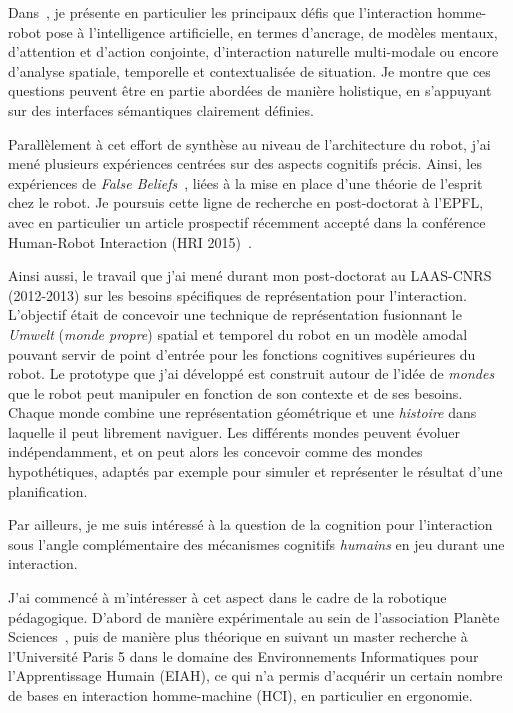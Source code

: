\documentclass[a4paper]{article}
\begin{document}
Dans~\cite{lemaignan2015human}, je présente en particulier les
principaux défis que l'interaction homme-robot pose à l'intelligence
artificielle, en termes d'ancrage, de modèles mentaux, d'attention et
d'action conjointe, d'interaction naturelle multi-modale ou encore d'analyse
spatiale, temporelle et contextualisée de situation. Je montre que ces
questions peuvent être en partie abordées de manière holistique, en s'appuyant
sur des interfaces sémantiques clairement définies.

Parallèlement à cet effort de synthèse au niveau de l'architecture du
robot, j'ai mené plusieurs expériences centrées sur des aspects cognitifs
précis. Ainsi, les expériences de \emph{False Beliefs}~\cite{warnier2012when},
liées à la mise en place d'une théorie de l'esprit chez le robot. Je poursuis
cette ligne de recherche en post-doctorat à l'EPFL, avec en particulier un article
prospectif récemment accepté dans la conférence Human-Robot
Interaction (HRI 2015)~\cite{lemaignan2015mutual}.

Ainsi aussi, le travail que j'ai mené durant mon post-doctorat au LAAS-CNRS
(2012-2013) sur les besoins spécifiques de représentation pour l'interaction.
L'objectif était de concevoir une technique de représentation fusionnant le
\emph{Umwelt} (\emph{monde propre}) spatial et temporel du robot en un modèle
amodal pouvant servir de point d'entrée pour les fonctions cognitives
supérieures du robot. Le prototype que j'ai développé est construit autour de
l'idée de \emph{mondes} que le robot peut manipuler en fonction de son contexte
et de ses besoins.  Chaque monde combine une représentation géométrique et une
\emph{histoire} dans laquelle il peut librement naviguer. Les différents mondes
peuvent évoluer indépendamment, et on peut alors les concevoir comme des mondes
hypothétiques, adaptés par exemple pour simuler et représenter le résultat d'une
planification.

Par ailleurs, je me suis intéressé à la question de la cognition pour
l'interaction sous l'angle complémentaire des mécanismes cognitifs
\emph{humains} en jeu durant une interaction.

J'ai commencé à m'intéresser à cet aspect dans le cadre de la robotique
pédagogique. D'abord de manière expérimentale au sein de l'association Planète
Sciences~\cite{stinckwich2007squeakbot}, puis de manière plus théorique en
suivant un master recherche à l'Université Paris 5 dans le domaine des
Environnements Informatiques pour l'Apprentissage Humain (EIAH), ce qui n'a permis
d'acquérir un certain nombre de bases en interaction homme-machine (HCI), en
particulier en ergonomie.
\end{document}
